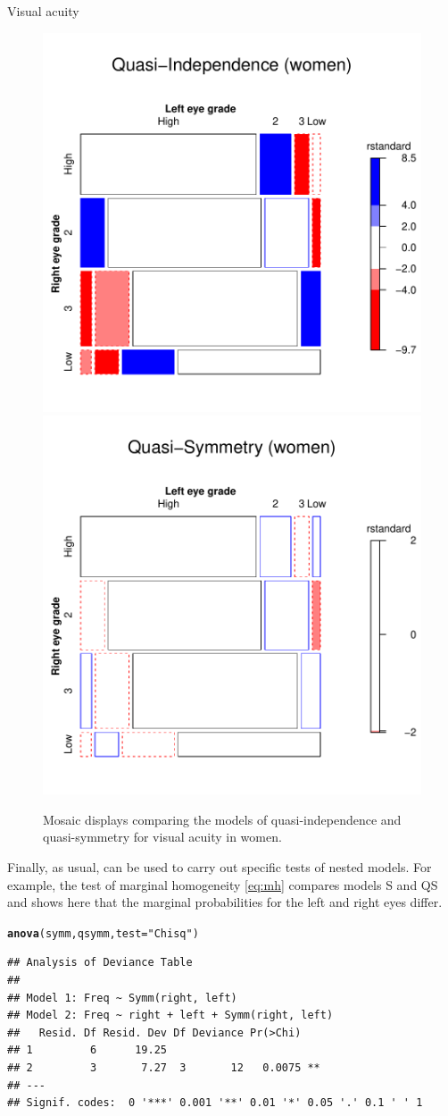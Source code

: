 \documentclass[11pt]{book}\usepackage[]{graphicx}\usepackage[]{color}
\makeatletter
\newcommand{\hlstr}[1]{\textcolor[rgb]{0.192,0.494,0.8}{#1}}%
\newcommand{\hlstd}[1]{\textcolor[rgb]{0.345,0.345,0.345}{#1}}%
\newcommand{\hlkwc}[1]{\textcolor[rgb]{0.333,0.667,0.333}{#1}}%
\newcommand{\hlkwd}[1]{\textcolor[rgb]{0.737,0.353,0.396}{\textbf{#1}}}%
\newenvironment{kframe}{%
 \def\at@end@of@kframe{}%
 \ifinner\ifhmode%
  \def\at@end@of@kframe{\end{minipage}}%
  \begin{minipage}{\columnwidth}%
 \fi\fi%
 \def\FrameCommand##1{\hskip\@totalleftmargin \hskip-\fboxsep
 \colorbox{shadecolor}{##1}\hskip-\fboxsep
     \hskip-\linewidth \hskip-\@totalleftmargin \hskip\columnwidth}%
 \MakeFramed {\advance\hsize-\width
   \@totalleftmargin\z@ \linewidth\hsize
   \@setminipage}}%
 {\par\unskip\endMakeFramed%
 \at@end@of@kframe}
\newenvironment{knitrout}{}{} %
\renewenvironment{knitrout}{\small\renewcommand{\baselinestretch}{.85}}{} %
\makeatother
\begin{document}
\begin{Example}{Visual acuity}
\begin{knitrout}
\begin{figure}[!htbp]
\centerline{\includegraphics[width=.49\textwidth]{ch08/fig/vision-mosaics-1} 
\includegraphics[width=.49\textwidth]{ch08/fig/vision-mosaics-2} }

\caption[Mosaic displays comparing the models of quasi-independence and quasi-symmetry for visual acuity in women]{Mosaic displays comparing the models of quasi-independence and quasi-symmetry for visual acuity in women.\label{fig:vision-mosaics}}
\end{figure}


\end{knitrout}

Finally, as usual,  can be used to carry out specific tests of nested models.
For example, the test of marginal homogeneity \eqref{eq:mh} compares
models S and QS and shows here that the marginal probabilities for the left and
right eyes differ.
\begin{knitrout}
\color{fgcolor}\begin{kframe}
\begin{alltt}
\hlkwd{anova}\hlstd{(symm, qsymm,} \hlkwc{test}\hlstd{=}\hlstr{"Chisq"}\hlstd{)}
\end{alltt}
\begin{verbatim}
## Analysis of Deviance Table
## 
## Model 1: Freq ~ Symm(right, left)
## Model 2: Freq ~ right + left + Symm(right, left)
##   Resid. Df Resid. Dev Df Deviance Pr(>Chi)   
## 1         6      19.25                        
## 2         3       7.27  3       12   0.0075 **
## ---
## Signif. codes:  0 '***' 0.001 '**' 0.01 '*' 0.05 '.' 0.1 ' ' 1
\end{verbatim}
\end{kframe}
\end{knitrout}


\end{Example}
\end{document}
